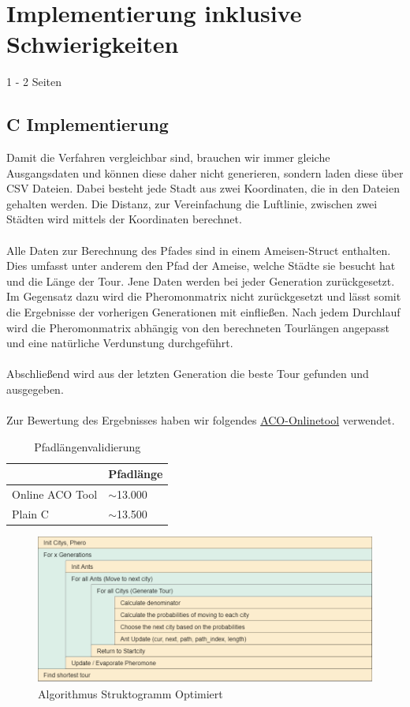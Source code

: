 \section{Implementierung inklusive Schwierigkeiten}
1 - 2 Seiten\\
\subsection*{C Implementierung}

Damit die Verfahren vergleichbar sind, brauchen wir immer gleiche Ausgangsdaten und können diese daher nicht generieren, sondern laden diese über CSV Dateien.
Dabei besteht jede Stadt aus zwei Koordinaten, die in den Dateien gehalten werden.
Die Distanz, zur Vereinfachung die Luftlinie, zwischen zwei Städten wird mittels der Koordinaten berechnet.
\\\\
Alle Daten zur Berechnung des Pfades sind in einem Ameisen-Struct enthalten.
Dies umfasst unter anderem den Pfad der Ameise, welche Städte sie besucht hat und die Länge der Tour.
Jene Daten werden bei jeder Generation zurückgesetzt.
Im Gegensatz dazu wird die Pheromonmatrix nicht zurückgesetzt und lässt somit die Ergebnisse der vorherigen Generationen mit einfließen.
Nach jedem Durchlauf wird die Pheromonmatrix abhängig von den berechneten Tourlängen angepasst und eine natürliche Verdunstung durchgeführt.
\\\\
Abschließend wird aus der letzten Generation die beste Tour gefunden und ausgegeben.
\\\\
Zur Bewertung des Ergebnisses haben wir folgendes \href{https://poolik.github.io/visual-aco/}{ACO-Onlinetool} verwendet.
\begin{table}[h]
    \centering
    \begin{tabular}{|l|l|}
    \hline
                    & Pfadlänge    \\ \hline
    Online ACO Tool & $\sim$13.000 \\ \hline
    Plain C         & $\sim$13.500 \\ \hline
    \end{tabular}
    \caption{\label{demo-table}Pfadlängenvalidierung}
\end{table}

\begin{figure}[H]
    \centering
    \includegraphics[width=16cm]{../images/struktog-optimiert.png}
    \caption{Algorithmus Struktogramm Optimiert}
    \label{fig:struktogramm-optimiert}
\end{figure}

